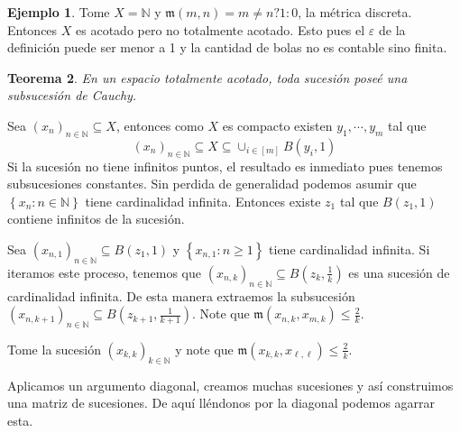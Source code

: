 \documentclass[12pt]{article}
\theoremstyle{plain}
\newtheorem{Th}{Teorema}[subsection]   %
\theoremstyle{definition}
\newtheorem{Ex}[Th]{Ejemplo}               %
\theoremstyle{remark}
\numberwithin{equation}{section}
\newcommand{\bN}{\mathbb{N}}        %
\newcommand{\mm}{\mathfrak{m}}      %
\renewcommand{\geq}{\geqslant}      %
\renewcommand{\leq}{\leqslant}      %
\renewcommand{\:}{\colon}           %
\newcommand{\conj}[1]{\left\lbrace#1\right\rbrace}
\newcommand{\bonj}[1]{\left\lbrack#1\right\rbrack}
\begin{document}
\begin{multicols}{2}
\begin{Ex}
  Tome $X=\bN$ y $\mm(m,n)= m\neq n? 1\colon 0$, la métrica discreta. Entonces $X$ es acotado pero no totalmente acotado. Esto pues el $\varepsilon$ de la definición puede ser menor a 1 y la cantidad de bolas no es contable sino finita.
\end{Ex}

\begin{Th}
  En un espacio totalmente acotado, toda sucesión poseé una subsucesión de Cauchy.
\end{Th}

\begin{ptcbp}
Sea $(x_n)_{n\in\bN}\subseteq X$, entonces como $X$ es compacto existen $y_1,\cdots, y_m$ tal que
$$(x_n)_{n\in\bN}\subseteq X\subseteq\cup_{i\in\bonj{m}}B(y_i,1)$$
Si la sucesión no tiene infinitos puntos, el resultado es inmediato pues tenemos subsucesiones constantes. Sin perdida de generalidad podemos asumir que $\conj{x_n\colon n\in\bN}$ tiene cardinalidad infinita. Entonces existe $z_1$ tal que $B(z_1,1)$ contiene infinitos de la sucesión.\par
Sea $(x_{n,1})_{n\in\bN}\subseteq B(z_1,1)$ y $\conj{x_{n,1}\colon n\geq 1}$ tiene cardinalidad infinita. Si iteramos este proceso, tenemos que $(x_{n,k})_{n\in\bN}\subseteq B(z_k,\frac{1}{k})$ es una sucesión de cardinalidad infinita. De esta manera extraemos la subsucesión $(x_{n,k+1})_{n\in\bN}\subseteq B(z_{k+1},\frac{1}{k+1})$. Note que $\mm(x_{n,k},x_{m,k})\leq\frac{2}{k}$.\par
Tome la sucesión $(x_{k,k})_{k\in\bN}$ y note que $\mm(x_{k,k},x_{\ell,\ell})\leq\frac{2}{k}$.
\end{ptcbp}

Aplicamos un argumento diagonal, creamos muchas sucesiones y así construimos una matriz de sucesiones. De aquí lléndonos por la diagonal podemos agarrar esta.

\iffalse
Totalmente acotado nos da la cantidad finita de bolas. Tenemos infitos señores en una cantidad finita de bolas. Hay una bola con infinitos de estos. Seguimos cubriendo el espacio, pero con bolas de radio menor $(1\to \frac{1}{2})$. Nuevamente una de estas bolas tiene una cantidad infinita de elementos. Otra vez existe una de estas bolas de medio radio que contiene infinitos señores. Seguimos sacando infinitos en bolas de tamaño un tercio, un cuarto, un quinto,... La subsucesión en el quinto paso es subsucesión de la cuarto paso que a su vez es del tercer paso y así. Pero estas subsucesiones son de los señores que ya había filtrado. \par
En algún momento llegue al paso $k$ y agarro una subsucesión infinita en una bola aún más pequeña. En el paso $k$ todos los puntos están apelotados. En el paso $\ell\geq k$ todos los del paso $\ell$ eran del paso $k$. Por la manera escogida no se repiten puntos.
\fi


\end{multicols}
\end{document}

